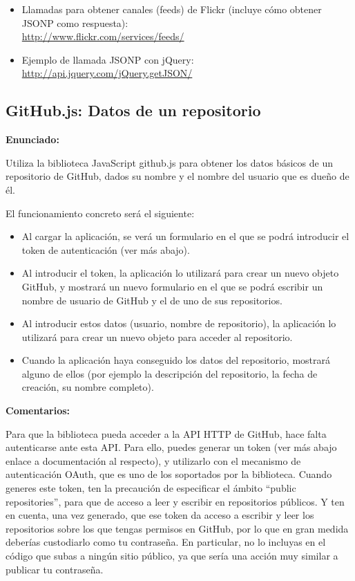 \begin{itemize}
\item Llamadas para obtener canales (feeds) de Flickr (incluye cómo obtener JSONP como respuesta): \\
  \url{http://www.flickr.com/services/feeds/}
\item Ejemplo de llamada JSONP con jQuery: \\
  \url{http://api.jquery.com/jQuery.getJSON/}
\end{itemize}


\subsection{GitHub.js: Datos de un repositorio}
\label{subsec:apis-github-repo}

\textbf{Enunciado:}

Utiliza la biblioteca JavaScript github.js para obtener los datos básicos de un repositorio de GitHub, dados su nombre y el nombre del usuario que es dueño de él.

El funcionamiento concreto será el siguiente:

\begin{itemize}
\item Al cargar la aplicación, se verá un formulario en el que se podrá introducir el token de autenticación (ver más abajo).
\item Al introducir el token, la aplicación lo utilizará para crear un nuevo objeto GitHub, y mostrará un nuevo formulario en el que se podrá escribir un nombre de usuario de GitHub y el de uno de sus repositorios.
\item Al introducir estos datos (usuario, nombre de repositorio), la aplicación lo utilizará para crear un nuevo objeto para acceder al repositorio.
\item Cuando la aplicación haya conseguido los datos del repositorio, mostrará alguno de ellos (por ejemplo la descripción del repositorio, la fecha de creación, su nombre completo).
\end{itemize}

\textbf{Comentarios:}

Para que la biblioteca pueda acceder a la API HTTP de GitHub, hace falta autenticarse ante esta API. Para ello, puedes generar un token (ver más abajo enlace a documentación al respecto), y utilizarlo con el mecanismo de autenticación OAuth, que es uno de los soportados por la biblioteca. Cuando generes este token, ten la precaución de especificar el ámbito ``public repositories'', para que de acceso a leer y escribir en repositorios públicos. Y ten en cuenta, una vez generado, que ese token da acceso a escribir y leer los repositorios sobre los que tengas permisos en GitHub, por lo que en gran medida deberías custodiarlo como tu contraseña. En particular, no lo incluyas en el código que subas a ningún sitio público, ya que sería una acción muy similar a publicar tu contraseña.

